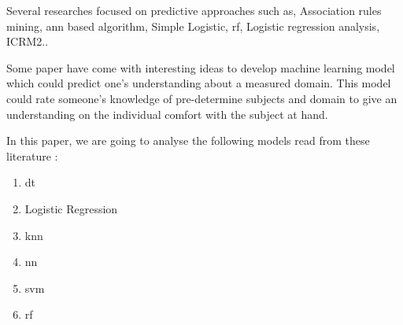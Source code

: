 \documentclass[../../main.tex]{subfiles}
\begin{document}
Several researches focused on predictive approaches such as, Association rules mining, \acrfull{ann} based algorithm, Simple Logistic, 
\acrfull{rf}, Logistic regression analysis, ICRM2.\cite{mduma_survey_2019}. 

Some paper have come with interesting ideas to develop machine learning model which could predict one's understanding about a measured domain. This model could rate someone's knowledge of pre-determine subjects and domain to give an understanding on the individual comfort with the subject at hand. \cite{lan_sparse_2014}

In this paper, we are going to analyse the following models read from these literature \cite{mduma_survey_2019,quinlan_induction_1986,yadav_mining_2012,heredia_student_2015,ramirez_prediction_2018,cox_regression_1958,perez_modelo_2018,pandey_data_2011,cover_nearest_1967,mardolkar_forecasting_2020,zhang_neural_2000,rudin_stop_2019,siri_predicting_2015,m_alban_she_is_with_the_faculty_of_engineering_and_applied_sciences_of_the_technical_university_cotopaxi_neural_2019,boser_training_1992,lee_machine_2019,behr_early_2020,friedman_stochastic_2002,eckert_analysis_2015,tenpipat_student_2020,liang_machine_2016,liang_big_2016,fischer_angulo_modelo_2012,miranda_analysis_2017,viloria_integration_2019,kemper_predicting_2020,agrusti_university_2019}:
\begin{enumerate}
\item \acrfull{dt}
\item Logistic Regression
\item \acrfull{knn}
\item \acrfull{nn}
\item \acrfull{svm}
\item \acrfull{rf}
\end{enumerate}
\end{document}

